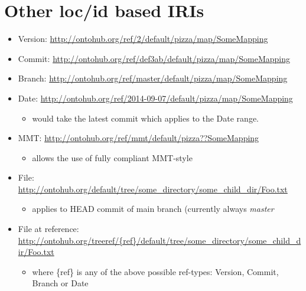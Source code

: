 \documentclass[a4paper,11pt,DIV=25]{scrartcl}
\begin{document}
\section{Other loc/id based IRIs}

\begin{itemize}
  \item Version: \url{http://ontohub.org/ref/2/default/pizza/map/SomeMapping}
  \item Commit: \url{http://ontohub.org/ref/def3ab/default/pizza/map/SomeMapping}
  \item Branch: \url{http://ontohub.org/ref/master/default/pizza/map/SomeMapping}
  \item Date: \url{http://ontohub.org/ref/2014-09-07/default/pizza/map/SomeMapping}
    \begin{itemize}
      \item would take the latest commit which applies to the Date range.
    \end{itemize}
  \item MMT: \url{http://ontohub.org/ref/mmt/default/pizza??SomeMapping}
    \begin{itemize}
      \item allows the use of fully compliant MMT-style
    \end{itemize}
  \item File: \url{http://ontohub.org/default/tree/some_directory/some_child_dir/Foo.txt}
    \begin{itemize}
      \item applies to HEAD commit of main branch (currently always \textit{master}
    \end{itemize}
  \item File at reference: \url{http://ontohub.org/treeref/\{ref\}/default/tree/some_directory/some_child_dir/Foo.txt}
    \begin{itemize}
      \item where \{ref\} is any of the above possible ref-types: Version, Commit, Branch or Date
    \end{itemize}
\end{itemize}
\end{document}
